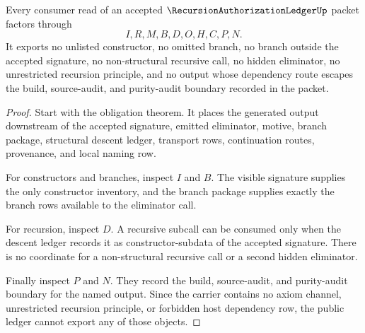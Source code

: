 \begin{theorem}
\label{thm:recursion-authorization-ledger-nonescape}
Every consumer read of an accepted $\RecursionAuthorizationLedgerUp$ packet factors through
$$
I,R,M,B,D,O,H,C,P,N.
$$
It exports no unlisted constructor, no omitted branch, no branch outside the accepted signature, no non-structural recursive call, no hidden eliminator, no unrestricted recursion principle, and no output whose dependency route escapes the build, source-audit, and purity-audit boundary recorded in the packet.
\end{theorem}
\begin{proof}
Start with the obligation theorem. It places the generated output downstream of the accepted signature, emitted eliminator, motive, branch package, structural descent ledger, transport rows, continuation routes, provenance, and local naming row.

For constructors and branches, inspect $I$ and $B$. The visible signature supplies the only constructor inventory, and the branch package supplies exactly the branch rows available to the eliminator call.

For recursion, inspect $D$. A recursive subcall can be consumed only when the descent ledger records it as constructor-subdata of the accepted signature. There is no coordinate for a non-structural recursive call or a second hidden eliminator.

Finally inspect $P$ and $N$. They record the build, source-audit, and purity-audit boundary for the named output. Since the carrier contains no axiom channel, unrestricted recursion principle, or forbidden host dependency row, the public ledger cannot export any of those objects.
\end{proof}

